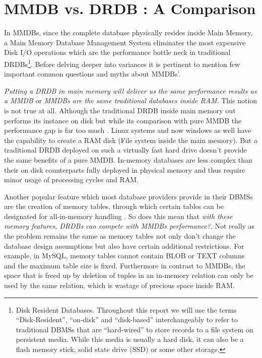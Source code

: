 \documentclass[12pt]{article} %
\begin{document}
\section{MMDB vs. DRDB : A Comparison}
In MMDBs, since the complete database physically resides inside Main Memory, a Main Memory Database Management System eliminates the most expensive Disk I/O operations which are the performance bottle neck in traditional DRDBs\footnote{Disk Resident Databases. Throughout this report we will use the terms “Disk-Resident”, “on-disk” and “disk-based” interchangeably to refer to traditional DBMSs that are “hard-wired” to store records to a file system on persistent media. While this media is usually a hard disk, it can also be a flash memory stick, solid state drive (SSD) or some other storage.}. Before delving deeper into variances it is pertinent to mention few important common questions and myths about MMDBs’.

\emph{Putting a DRDB in main memory will deliver us the same performance results as a MMDB} or \emph{MMDBs are the same traditional databases inside RAM}. This notion is not true at all. Although the traditional DRDB inside main memory out performs its instance on disk but while its comparison with pure MMDB the performance gap is far too much \cite{Mcobject-ramdisk}. Linux systems and now windows as well have the capability to create a RAM disk (File system inside the main memory). But a traditional DRDB deployed on such a virtually fast hard drive doesn't provide the same benefits of a pure MMDB. In-memory databases are less complex than their on disk counterparts fully deployed in physical memory and thus require minor usage of processing cycles and RAM.

Another popular feature which most database providers provide in their DBMSs are the creation of memory tables, through which certain tables can be designated for all-in-memory handling \cite{Mcobject-Myths}. So does this mean that \emph{with these memory features, DRDBs can compete with MMDBs performance?}. Not really as the problem remains the same as memory tables not only don't change the database design assumptions but also have certain additional restrictions. For example, in MySQL, memory tables cannot contain BLOB or TEXT columns and the maximum table size is fixed. Furthermore in contrast to MMDBs, the space that is freed up by deletion of tuples in an in-memory relation can only be used by the same relation, which is wastage of precious space inside RAM.
\end{document}
